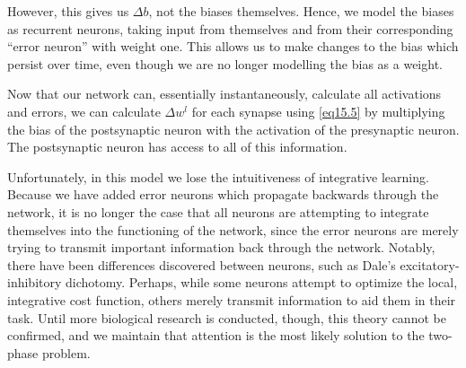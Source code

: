 \documentclass[12pt]{article}
\begin{document}
 However, this gives us $\Delta b$, not the biases themselves. Hence, we model the biases as recurrent neurons, taking input from themselves and from their corresponding ``error neuron'' with weight one. This allows us to make changes to the bias which persist over time, even though we are no longer modelling the bias as a weight.
 
Now that our network can, essentially instantaneously, calculate all activations and errors, we can calculate $\Delta w^l$ for each synapse using \ref{eq15.5} by multiplying the bias of the postsynaptic neuron with the activation of the presynaptic neuron. The postsynaptic neuron has access to all of this information.

Unfortunately, in this model we lose the intuitiveness of integrative learning. Because we have added error neurons which propagate backwards through the network, it is no longer the case that all neurons are attempting to integrate themselves into the functioning of the network, since the error neurons are merely trying to transmit important information back through the network. Notably, there have been differences discovered between neurons, such as Dale's excitatory-inhibitory dichotomy. \cite{Dale1953} Perhaps, while some neurons attempt to optimize the local, integrative cost function, others merely transmit information to aid them in their task. Until more biological research is conducted, though, this theory cannot be confirmed, and we maintain that attention is the most likely solution to the two-phase problem.





\end{document}
